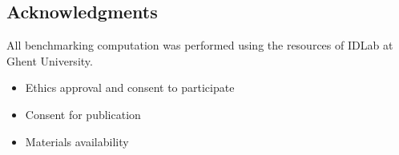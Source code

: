 \documentclass[pdflatex,sn-mathphys-num]{sn-jnl}%
\theoremstyle{thmstyleone}%
\theoremstyle{thmstyletwo}%
\theoremstyle{thmstylethree}%
\begin{document}
\subsection{Acknowledgments}
All benchmarking computation was performed using the resources of IDLab at Ghent University.

\begin{itemize} 
\item Ethics approval and consent to participate
\item Consent for publication
\item Materials availability
\end{itemize}

\end{document}
